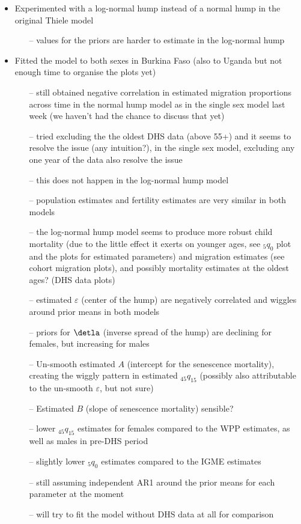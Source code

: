 \documentclass[12pt,a4paper]{article}
\date{\vspace{-5ex}}
\begin{document}
\begin{itemize}
\item Experimented with a log-normal hump instead of a normal hump in the original Thiele model
	\begin{itemize}
	\item[--] values for the priors are harder to estimate in the log-normal hump
	\end{itemize}
\item Fitted the model to both sexes in Burkina Faso (also to Uganda but not enough time to organise the plots yet)
	\begin{itemize}
	\item[--] still obtained negative correlation in estimated migration proportions across time in the normal hump model as in the single sex model last week (we haven't had the chance to discuss that yet)
	\item[--] tried excluding the the oldest DHS data (above 55+) and it seems to resolve the issue (any intuition?), in the single sex model, excluding any one year of the data also resolve the issue
	\item[--] this does not happen in the log-normal hump model
	\item[--] population estimates and fertility estimates are very similar in both models
	\item[--] the log-normal hump model seems to produce more robust child mortality (due to the little effect it exerts on younger ages, see $_5q_0$ plot and the plots for estimated parameters) and migration estimates (see cohort migration plots), and possibly mortality estimates at the oldest ages? (DHS data plots)
	\item[--] estimated $\varepsilon$ (center of the hump) are negatively correlated and wiggles around prior means in both models 
	\item[--] priors for $\detla$ (inverse spread of the hump) are declining for females, but increasing for males
	\item[--] Un-smooth estimated $A$ (intercept for the senescence mortality), creating the wiggly pattern in estimated $_{45}q_{15}$ (possibly also attributable to the un-smooth $\varepsilon$, but not sure) 
	\item[--] Estimated $B$ (slope of senescence mortality) sensible?
	\item[--] lower $_{45}q_{15}$ estimates for females compared to the WPP estimates, as well as males in pre-DHS period
	\item[--] slightly lower $_5q_0$ estimates compared to the IGME estimates
	\item[--] still assuming independent AR1 around the prior means for each parameter at the moment
	\item[--] will try to fit the model without DHS data at all for comparison
	\end{itemize}
\end{itemize}
\end{document}
